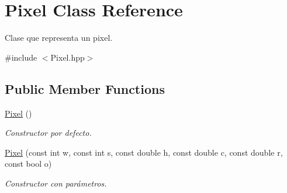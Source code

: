\hypertarget{classPixel}{}\section{Pixel Class Reference}
\label{classPixel}


Clase que representa un pixel.  




{\ttfamily \#include $<$Pixel.\+hpp$>$}

\subsection*{Public Member Functions}
\begin{DoxyCompactItemize}
\item 
\hyperlink{classPixel_a27ad99a2f705e635c42d242d530d4756}{Pixel} ()
\begin{DoxyCompactList}\small\item\em Constructor por defecto. \end{DoxyCompactList}\item 
\hyperlink{classPixel_a49f12fc19e6fc242e1b2b6875665924e}{Pixel} (const int w, const int s, const double h, const double c, const double r, const bool o)
\begin{DoxyCompactList}\small\item\em Constructor con parámetros. \end{DoxyCompactList}\end{DoxyCompactItemize}
